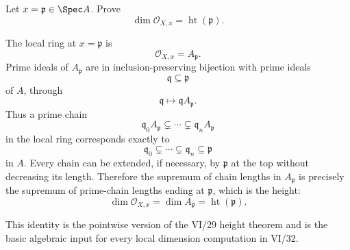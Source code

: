 \begin{problem}\label{prob:vi32-03}
Let \(x=\mathfrak p\in\Spec A\). Prove
\[
\dim\mathcal O_{X,x}=\operatorname{ht}(\mathfrak p).
\]

\end{problem}

\ifdefined\FullProblemDossiers
\begin{solution}
The local ring at \(x=\mathfrak p\) is
\[
\mathcal O_{X,x}=A_{\mathfrak p}.
\]
Prime ideals of \(A_{\mathfrak p}\) are in inclusion-preserving bijection with prime ideals
\[
\mathfrak q\subseteq\mathfrak p
\]
of \(A\), through
\[
\mathfrak q\longmapsto\mathfrak qA_{\mathfrak p}.
\]
Thus a prime chain
\[
\mathfrak q_0A_{\mathfrak p}
\subsetneq\cdots\subsetneq
\mathfrak q_nA_{\mathfrak p}
\]
in the local ring corresponds exactly to
\[
\mathfrak q_0\subsetneq\cdots\subsetneq\mathfrak q_n\subseteq\mathfrak p
\]
in \(A\). Every chain can be extended, if necessary, by \(\mathfrak p\) at the top without decreasing its length.
Therefore the supremum of chain lengths in \(A_{\mathfrak p}\) is precisely the supremum of prime-chain lengths
ending at \(\mathfrak p\), which is the height:
\[
\boxed{
\dim\mathcal O_{X,x}
=
\dim A_{\mathfrak p}
=
\operatorname{ht}(\mathfrak p).
}
\]

This identity is the pointwise version of the VI/29 height theorem and is the basic algebraic input for every local
dimension computation in VI/32.
\end{solution}
\fi
